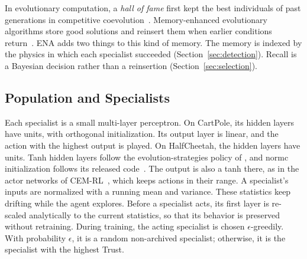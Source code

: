 In evolutionary computation, a \textit{hall of fame} first kept the best individuals of past generations in competitive coevolution~\citep{rosin1997new}. Memory-enhanced evolutionary algorithms store good solutions and reinsert them when earlier conditions return~\citep{branke1999memory}. ENA adds two things to this kind of memory. The memory is indexed by the physics in which each specialist succeeded (Section~\ref{sec:detection}). Recall is a Bayesian decision rather than a reinsertion (Section~\ref{sec:selection}).

\subsection{Population and Specialists}
Each specialist is a small multi-layer perceptron. On CartPole, its hidden layers have  units, with orthogonal initialization. Its output layer is linear, and the action with the highest output is played. On HalfCheetah, the hidden layers have  units. Tanh hidden layers follow the evolution-strategies policy of \citet{salimans2017evolution}, and normc initialization follows its released code~\citep{openai2017esstarter}. The output is also a tanh there, as in the actor networks of CEM-RL~\citep{pourchot2019cemrl}, which keeps actions in their range. A specialist's inputs are normalized with a running mean and variance. These statistics keep drifting while the agent explores. Before a specialist acts, its first layer is re-scaled analytically to the current statistics, so that its behavior is preserved without retraining. During training, the acting specialist is chosen $\epsilon$-greedily. With probability $\epsilon$, it is a random non-archived specialist; otherwise, it is the specialist with the highest Trust.

